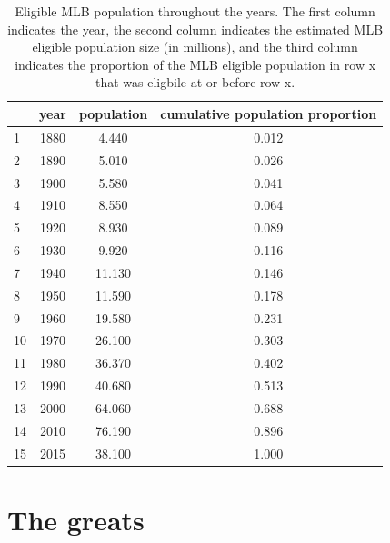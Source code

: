 \documentclass[11pt]{article}\usepackage[]{graphicx}\usepackage[]{color}
\begin{document}


\begin{table}[ht]
\centering
\begin{tabular}{lccc}
  \hline
 & year & population & cumulative population proportion \\ 
  \hline
1 & 1880 & 4.440 & 0.012 \\ 
  2 & 1890 & 5.010 & 0.026 \\ 
  3 & 1900 & 5.580 & 0.041 \\ 
  4 & 1910 & 8.550 & 0.064 \\ 
  5 & 1920 & 8.930 & 0.089 \\ 
  6 & 1930 & 9.920 & 0.116 \\ 
  7 & 1940 & 11.130 & 0.146 \\ 
  8 & 1950 & 11.590 & 0.178 \\ 
  9 & 1960 & 19.580 & 0.231 \\ 
  10 & 1970 & 26.100 & 0.303 \\ 
  11 & 1980 & 36.370 & 0.402 \\ 
  12 & 1990 & 40.680 & 0.513 \\ 
  13 & 2000 & 64.060 & 0.688 \\ 
  14 & 2010 & 76.190 & 0.896 \\ 
  15 & 2015 & 38.100 & 1.000 \\ 
   \hline
\end{tabular}
\caption{Eligible MLB population throughout the years. The first 
    column indicates the year, the second column indicates the 
    estimated MLB eligible population size (in millions), and the 
    third column indicates the proportion of the MLB eligible  
    population in row x that was eligbile at or before row x.} 
\end{table}






\section{The greats}
\end{document}
